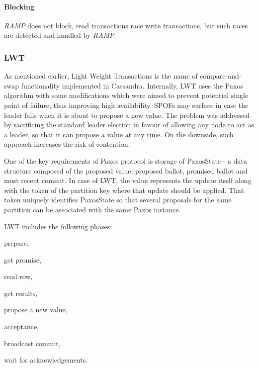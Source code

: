 \paragraph{Blocking} \emph{RAMP} does not block, read transactions race write transactions, but such races are detected and handled by \emph{RAMP}.




%

\subsubsection{LWT}\label{sec:theory:transactions:lwt}

As mentioned earlier, Light Weight Transactions is the name of compare-and-swap functionality implemented in Cassandra. Internally, LWT uses the Paxos algorithm with some modifications which were aimed to prevent potential single point of failure, thus improving high availability. SPOFs may surface in case the leader fails when it is about to propose a new value. The problem was addressed by sacrificing the standard leader election in favour of allowing any node to act as a leader, so that it can propose a value at any time. On the downside, such approach increases the risk of contention. 

One of the key requirements of Paxos protocol is storage of PaxosState - a data structure composed of the proposed value, proposed ballot, promised ballot and most recent commit. In case of LWT, the value represents the update itself along with the token of the partition key where that update should be applied. That token uniquely identifies PaxosState so that several proposals for the same partition can be associated with the same Paxos instance. 


LWT includes the following phases: \begin{enumerate*}
\item prepare,
\item get promise,
\item read row,
\item get results,
\item propose a new value,
\item acceptance,
\item broadcast commit,
\item wait for acknowledgements.
\end{enumerate*} 

